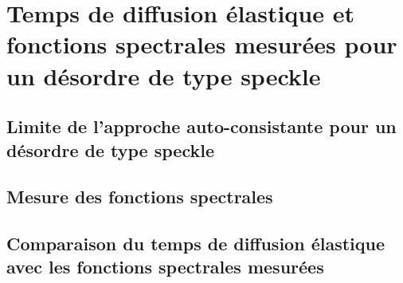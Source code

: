 \section{Temps de diffusion élastique et fonctions spectrales mesurées pour un désordre de type speckle}
\subsection{Limite de l'approche auto-consistante pour un désordre de type speckle}
\subsection{Mesure des fonctions spectrales}
\subsection{Comparaison du temps de diffusion élastique avec les fonctions spectrales mesurées}
